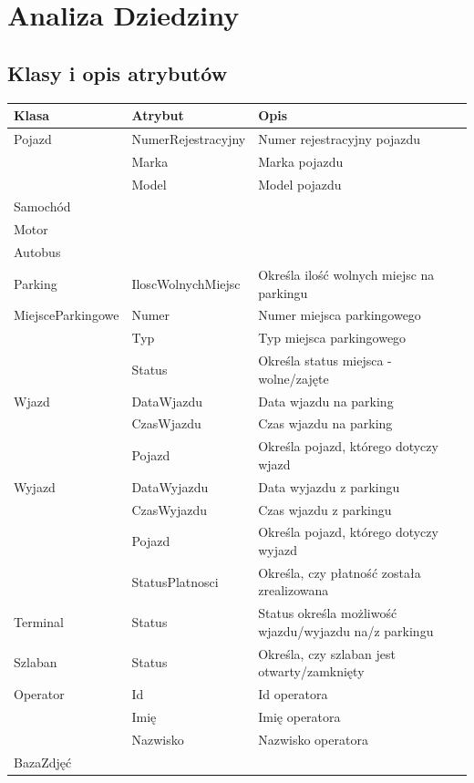 \chapter{Analiza Dziedziny}
\label{cha:anDziedziny}

\section{Klasy i opis atrybutów}
\label{sec:klasyAtrybuty}
\begin{table}[H]
	\begin{tabular}{|l|l|l|} \hline
	\textbf{Klasa}	& \textbf{Atrybut} & \textbf{Opis} \\ \hline%
	Pojazd	& NumerRejestracyjny & Numer rejestracyjny pojazdu \\
	& Marka & Marka pojazdu \\
	& Model & Model pojazdu \\
	Samochód& & \\
	Motor& &  \\
	Autobus& & \\
	Parking	& IloscWolnychMiejsc & Określa ilość wolnych miejsc na parkingu \\
	MiejsceParkingowe	& Numer & Numer miejsca parkingowego \\
	& Typ & Typ miejsca parkingowego \\
	& Status & Określa status miejsca - wolne/zajęte \\
	Wjazd	& DataWjazdu & Data wjazdu na parking\\
	& CzasWjazdu & Czas wjazdu na parking \\
	& Pojazd & Określa pojazd, którego dotyczy wjazd \\
	Wyjazd	& DataWyjazdu & Data wyjazdu z parkingu\\
	& CzasWyjazdu & Czas wjazdu z parkingu \\
	& Pojazd & Określa pojazd, którego dotyczy wyjazd \\
	& StatusPlatnosci & Określa, czy płatność została zrealizowana \\
	Terminal & Status & Status określa możliwość wjazdu/wyjazdu na/z parkingu \\
	Szlaban & Status & Określa, czy szlaban jest otwarty/zamknięty\\
	Operator& Id & Id operatora \\
	& Imię & Imię operatora \\
	& Nazwisko & Nazwisko operatora \\
	BazaZdjęć& &  \\ \hline
	\end{tabular}
\end{table}


